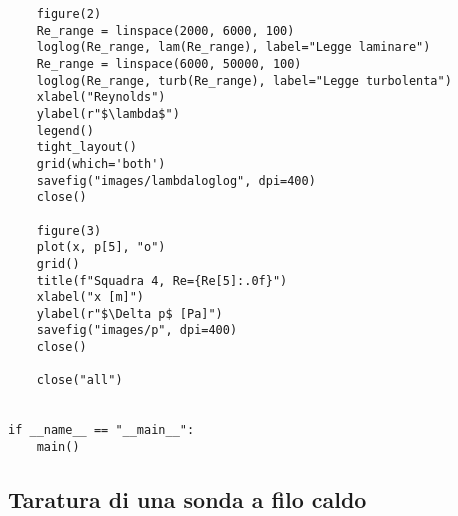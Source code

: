 \begin{lstlisting}
    figure(2)
    Re_range = linspace(2000, 6000, 100)
    loglog(Re_range, lam(Re_range), label="Legge laminare")
    Re_range = linspace(6000, 50000, 100)
    loglog(Re_range, turb(Re_range), label="Legge turbolenta")
    xlabel("Reynolds")
    ylabel(r"$\lambda$")
    legend()
    tight_layout()
    grid(which='both')
    savefig("images/lambdaloglog", dpi=400)
    close()

    figure(3)
    plot(x, p[5], "o")
    grid()
    title(f"Squadra 4, Re={Re[5]:.0f}")
    xlabel("x [m]")
    ylabel(r"$\Delta p$ [Pa]")
    savefig("images/p", dpi=400)
    close()

    close("all")


if __name__ == "__main__":
    main()
\end{lstlisting}

\subsection{Taratura di una sonda a filo caldo}\label{b8}

